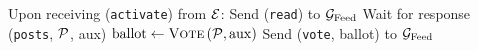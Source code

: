 \begin{algorithm}[H]
  \caption{$\honeststr\left(\textsc{Vote}\right)$}
  \label{alg:honest}
  \begin{algorithmic}[1]
    \State Upon receiving (\texttt{activate}) from $\mathcal{E}$:
    \label{alg:honest:activate}
    \Indent
      \State Send (\texttt{read}) to $\mathcal{G}_{\mathrm{Feed}}$
      \State Wait for response (\texttt{posts}, $\mathcal{P}$, aux)
      \State $\mathrm{ballot} \gets \textsc{Vote}\left(\mathcal{P},
      \mathrm{aux}\right)$
      \State Send (\texttt{vote}, ballot) to $\mathcal{G}_{\mathrm{Feed}}$
    \EndIndent
  \end{algorithmic}
\end{algorithm}
